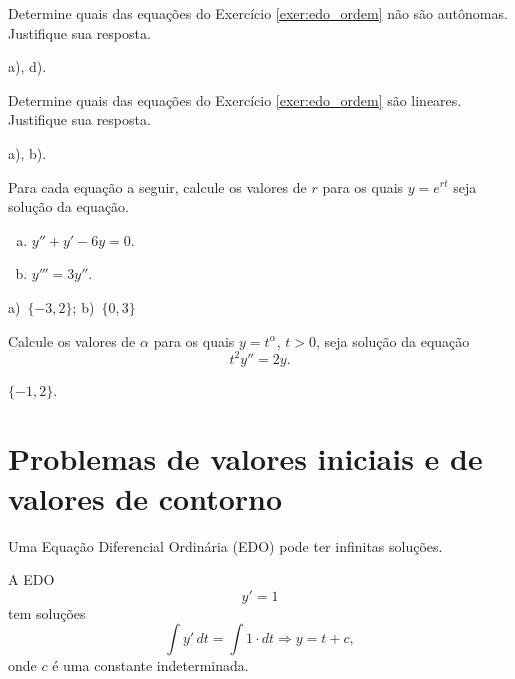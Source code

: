 \begin{exer}
  Determine quais das equações do Exercício \ref{exer:edo_ordem} não são autônomas. Justifique sua resposta.
\end{exer}
\begin{resp}
  a), d).
\end{resp}

\begin{exer}
  Determine quais das equações do Exercício \ref{exer:edo_ordem} são lineares. Justifique sua resposta.
\end{exer}
\begin{resp}
  a), b).
\end{resp}

\begin{exer}
  Para cada equação a seguir, calcule os valores de $r$ para os quais $y = e^{rt}$ seja solução da equação.
  \begin{enumerate}[a)]
  \item $y'' + y' - 6y = 0$.
  \item $y''' = 3y''$.
  \end{enumerate}
\end{exer}
\begin{resp}
  a)~$\{-3, 2\}$; b)~$\{0, 3\}$
\end{resp}

\begin{exer}
  Calcule os valores de $\alpha$ para os quais $y = t^\alpha$, $t>0$, seja solução da equação
  \begin{equation}
    t^2y'' = 2y.
  \end{equation}
\end{exer}
\begin{resp}
  $\{-1, 2\}$.
\end{resp}


\section{Problemas de valores iniciais e de valores de contorno}\label{cap_intro_sec_pv}

Uma Equação Diferencial Ordinária (EDO) pode ter infinitas soluções.

\begin{ex}
A EDO
\begin{equation}
  y' = 1
\end{equation}
tem soluções
\begin{equation}
  \int y'\,dt = \int 1\cdot dt \Rightarrow y = t + c,
\end{equation}
onde $c$ é uma constante indeterminada.
\end{ex}


